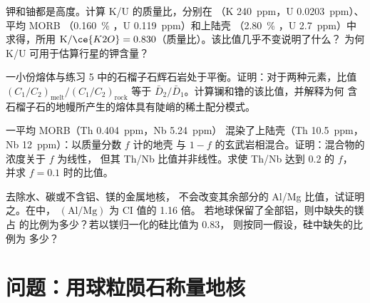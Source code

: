 \begin{exercise}[$\star\star$]\label{exo:b2:elements-in-the-earth:9}
钾和铀都是高度。计算 K/U 的质量比，分别在
（K \qty{240}{ppm}，U \qty{0.0203}{ppm}）、平均 MORB
（\qty{0.160}{\percent} ，U \qty{0.119}{ppm}）和上陆壳
（\qty{2.80}{\percent} ，U \qty{2.7}{ppm}）中求得，所用
$\mathrm{K}/\ce{K2O} = 0.830$（质量比）。该比值几乎不变说明了什么？
为何 K/U 可用于估算行星的钾含量？
\end{exercise}

\begin{exercise}[$\star\star\star$]\label{exo:b2:elements-in-the-earth:10}
一小份熔体与练习
5 中的石榴子石辉石岩处于平衡。证明：对于两种元素，比值
$(C_1/C_2)_{\mathrm{melt}}/(C_1/C_2)_{\mathrm{rock}}$ 等于
$\bar D_2/\bar D_1$。计算镧和镥的该比值，并解释为何
含石榴子石的地幔所产生的熔体具有陡峭的稀土配分模式。
\end{exercise}

\begin{exercise}[$\star\star\star$]\label{exo:b2:elements-in-the-earth:11}
一平均 MORB（Th \qty{0.404}{ppm}，Nb \qty{5.24}{ppm}）
混染了上陆壳（Th \qty{10.5}{ppm}，Nb \qty{12}{ppm}）：以质量分数 $f$ 计的地壳
与 $1-f$ 的玄武岩相混合。证明：混合物的浓度关于 $f$ 为线性，
但其 Th/Nb 比值并非线性。求使 Th/Nb 达到 0.2 的 $f$，
并求 $f = 0.1$ 时的比值。
\end{exercise}

\begin{exercise}[$\star\star\star$]\label{exo:b2:elements-in-the-earth:12}
去除水、碳或不含铝、镁的金属地核，
不会改变其余部分的 Al/Mg 比值，试证明之。在中，
$(\mathrm{Al}/\mathrm{Mg})$ 为 CI 值的 1.16 倍。
若地球保留了全部铝，则中缺失的镁占
的比例为多少？若以镁归一化的硅比值为 0.83，
则按同一假设，硅中缺失的比例为
多少？
\end{exercise}

\section{问题：用球粒陨石称量地核}

